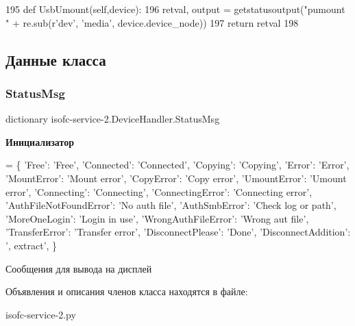 \begin{DoxyCode}
195     \textcolor{keyword}{def }UsbUmount(self,device):
196         retval, output = getstatusoutput(\textcolor{stringliteral}{"pumount "} + re.sub(\textcolor{stringliteral}{r'dev'}, \textcolor{stringliteral}{'media'}, device.device\_node))
197         \textcolor{keywordflow}{return} retval
198 
\end{DoxyCode}


\subsection{Данные класса}
\mbox{\label{classisofc-service-2_1_1DeviceHandler_a95f5cb075a653330abd901ce95f715a8}} 
\subsubsection{\texorpdfstring{Status\+Msg}{StatusMsg}}
{\footnotesize\ttfamily dictionary isofc-\/service-\/2.Device\+Handler.\+Status\+Msg\hspace{0.3cm}{\ttfamily [static]}}

{\bfseries Инициализатор}
\begin{DoxyCode}
=  \{
        \textcolor{stringliteral}{'Free'}: \textcolor{stringliteral}{'Free'},
        \textcolor{stringliteral}{'Connected'}: \textcolor{stringliteral}{'Connected'},
        \textcolor{stringliteral}{'Copying'}: \textcolor{stringliteral}{'Copying'},
        \textcolor{stringliteral}{'Error'}: \textcolor{stringliteral}{'Error'},
        \textcolor{stringliteral}{'MountError'}: \textcolor{stringliteral}{'Mount error'},
        \textcolor{stringliteral}{'CopyError'}: \textcolor{stringliteral}{'Copy error'},
        \textcolor{stringliteral}{'UmountError'}: \textcolor{stringliteral}{'Umount error'},
        \textcolor{stringliteral}{'Connecting'}: \textcolor{stringliteral}{'Connecting'},
        \textcolor{stringliteral}{'ConnectingError'}: \textcolor{stringliteral}{'Connecting error'},
        \textcolor{stringliteral}{'AuthFileNotFoundError'}: \textcolor{stringliteral}{'No auth file'},
        \textcolor{stringliteral}{'AuthSmbError'}: \textcolor{stringliteral}{'Check log or path'},
        \textcolor{stringliteral}{'MoreOneLogin'}: \textcolor{stringliteral}{'Login in use'},
        \textcolor{stringliteral}{'WrongAuthFileError'}: \textcolor{stringliteral}{'Wrong aut file'},
        \textcolor{stringliteral}{'TransferError'}: \textcolor{stringliteral}{'Transfer error'},
        \textcolor{stringliteral}{'DisconnectPlease'}: \textcolor{stringliteral}{'Done'},
        \textcolor{stringliteral}{'DisconnectAddition'}: \textcolor{stringliteral}{', extract'},
    \}
\end{DoxyCode}


Сообщения для вывода на дисплей 



Объявления и описания членов класса находятся в файле\+:\begin{DoxyCompactItemize}
\item 
isofc-\/service-\/2.\+py\end{DoxyCompactItemize}
